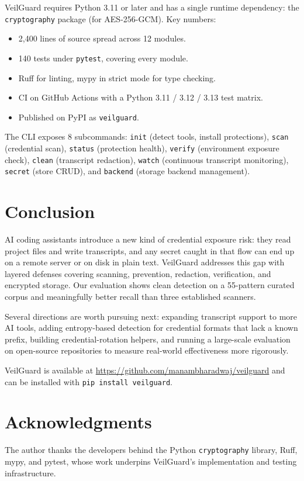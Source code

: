 \documentclass[conference]{IEEEtran}
\begin{document}
VeilGuard requires Python 3.11 or later and has a single runtime dependency:
the \texttt{cryptography} package (for AES-256-GCM). Key numbers:

\begin{itemize}
  \item 2{,}400 lines of source spread across 12 modules.
  \item 140 tests under \texttt{pytest}, covering every module.
  \item Ruff for linting, mypy in strict mode for type checking.
  \item CI on GitHub Actions with a Python 3.11 / 3.12 / 3.13 test matrix.
  \item Published on PyPI as \texttt{veilguard}.
\end{itemize}

The CLI exposes 8 subcommands: \texttt{init} (detect tools, install
protections), \texttt{scan} (credential scan), \texttt{status} (protection
health), \texttt{verify} (environment exposure check), \texttt{clean}
(transcript redaction), \texttt{watch} (continuous transcript monitoring),
\texttt{secret} (store CRUD), and \texttt{backend} (storage backend
management).


\section{Conclusion}
\label{sec:conclusion}

AI coding assistants introduce a new kind of credential exposure risk: they
read project files and write transcripts, and any secret caught in that flow
can end up on a remote server or on disk in plain text. VeilGuard addresses
this gap with layered defenses covering scanning, prevention, redaction,
verification, and encrypted storage. Our evaluation shows clean detection on a
55-pattern curated corpus and meaningfully better recall than three
established scanners.

Several directions are worth pursuing next: expanding transcript support to
more AI tools, adding entropy-based detection for credential formats that
lack a known prefix, building credential-rotation helpers, and running a
large-scale evaluation on open-source repositories to measure real-world
effectiveness more rigorously.

VeilGuard is available at
\url{https://github.com/manambharadwaj/veilguard} and can be installed with
\texttt{pip install veilguard}.


\section*{Acknowledgments}

The author thanks the developers behind the Python \texttt{cryptography}
library, Ruff, mypy, and pytest, whose work underpins VeilGuard's
implementation and testing infrastructure.



\end{document}
